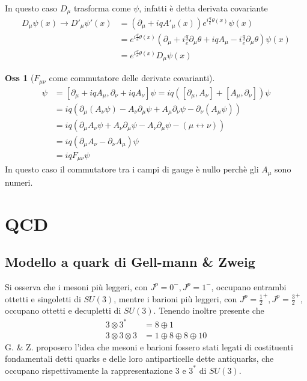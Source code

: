 \documentclass[10pt,a4paper]{article}
\theoremstyle{definition}
\newtheorem{observation}{Oss}[section]
\begin{document}
In questo caso $D_\mu$ trasforma come $\psi$, infatti è detta derivata covariante
\begin{align*}
    D_\mu\psi(x) \to D'_\mu\psi'(x) &= \left(\partial_\mu + iqA'_\mu(x)\right)e^{i\frac{q}{e}\theta(x)}\psi(x) \\
    &= e^{i\frac{q}{e}\theta(x)}\left(\partial_\mu + i\frac{q}{e}\partial_\mu\theta + iqA_\mu - i\frac{q}{e}\partial_\mu\theta\right)\psi(x) \\
    &= e^{i\frac{q}{e}\theta(x)}D_\mu\psi(x)    
\end{align*}

\begin{observation}[$F_{\mu \nu}$ come commutatore delle derivate covarianti]
    \begin{align*}
        [D_\mu, D_\nu]\psi &= [\partial_\mu + iqA_\mu, \partial_\nu + iqA_\nu]\psi = iq([\partial_\mu, A_\nu] + [A_\mu, \partial_\nu])\psi \\
        &= iq \left(\partial_\mu(A_\nu \psi) - A_\nu\partial_\mu\psi + A_\mu\partial_\nu\psi - \partial_\nu(A_\mu\psi)\right) \\
        &= iq (\partial_\mu A_\nu \psi + A_\nu \partial_\mu \psi - A_\nu\partial_\mu\psi - (\mu \leftrightarrow \nu )) \\
        &= iq (\partial_\mu A_\nu - \partial_\nu A_\mu)\psi \\
        &= iq F_{\mu \nu}\psi
    \end{align*}
In questo caso il commutatore tra i campi di gauge è nullo perchè gli $A_\mu$ sono numeri.
\end{observation}


\section{QCD}
\subsection{Modello a quark di Gell-mann \& Zweig}
Si osserva che i mesoni più leggeri, con \(J^p = 0^-, J^p = 1^-\), occupano entrambi ottetti e singoletti di \(SU(3)\), mentre i barioni più leggeri, con \(J^p = \frac12^+, J^p=\frac32^+\), occupano ottetti e decupletti di \(SU(3)\).
Tenendo inoltre presente che 
\begin{align*}
    3 \otimes 3^* &= 8 \oplus 1 \\
    3 \otimes 3 \otimes 3 &= 1 \oplus 8 \oplus 8 \oplus 10
\end{align*}
G. \& Z. proposero l'idea che mesoni e barioni fossero stati legati di costituenti fondamentali detti quarks e delle loro antiparticelle dette antiquarks, che occupano rispettivamente la rappresentazione \(3\) e \(3^*\) di \(SU(3)\).
\end{document}
